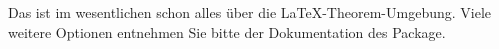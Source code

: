 
Das ist im wesentlichen schon alles über die \LaTeX-Theorem-Umgebung. Viele weitere Optionen entnehmen Sie bitte der Dokumentation des Package. 
